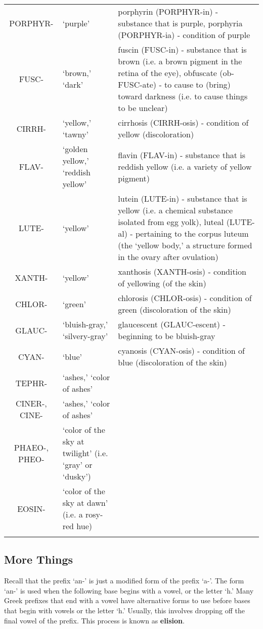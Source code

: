 \begin{longtable}{c | p{} | p{}}
        PORPHYR- & `purple' & porphyrin (PORPHYR-in) - substance that is purple, porphyria (PORPHYR-ia) - condition of purple \\
        FUSC- & `brown,' `dark' & fuscin (FUSC-in) - substance that is brown (i.e. a brown pigment in the retina of the eye), obfuscate (ob-FUSC-ate) - to cause to (bring) toward darkness (i.e. to cause things to be unclear) \\
        CIRRH- & `yellow,' `tawny' & cirrhosis (CIRRH-osis) - condition of yellow (discoloration) \\
        FLAV- & `golden yellow,' `reddish yellow' & flavin (FLAV-in) - substance that is reddish yellow (i.e. a variety of yellow pigment) \\
        LUTE- & `yellow' & lutein (LUTE-in) - substance that is yellow (i.e. a chemical substance isolated from egg yolk), luteal (LUTE-al) - pertaining to the corpus luteum (the `yellow body,' a structure formed in the ovary after ovulation) \\
        XANTH- & `yellow' & xanthosis (XANTH-osis) - condition of yellowing (of the skin) \\
        CHLOR- & `green' & chlorosis (CHLOR-osis) - condition of green (discoloration of the skin) \\
        GLAUC- & `bluish-gray,' `silvery-gray' & glaucescent (GLAUC-escent) - beginning to be bluish-gray \\
        CYAN- & `blue' & cyanosis (CYAN-osis) - condition of blue (discoloration of the skin) \\
        TEPHR- & `ashes,' `color of ashes' & \\
        CINER-, CINE- & `ashes,' `color of ashes' & \\ 
        PHAEO-, PHEO- & `color of the sky at twilight' (i.e. `gray' or `dusky') & \\
        EOSIN- & `color of the sky at dawn' (i.e. a rosy-red hue) & \\
    \label{tab:Ch4Bases}
\end{longtable}


\subsection{More Things}

Recall that the prefix `an-' is just a modified form of the prefix `a-'. The form `an-' is used when the following base begins with a vowel, or the letter `h.' Many Greek prefixes that end with a vowel have alternative forms to use before bases that begin with vowels or the letter `h.' Usually, this involves dropping off the final vowel of the prefix. This process is known as \textbf{elision}.


